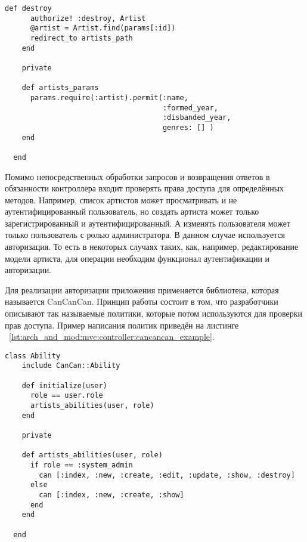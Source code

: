 \begin{lstlisting}[style=fsharpstyle,caption={Пример получения артистов по определённым параметрам}, label=lst:arch_and_mod:mvc:controller:artists_controller_example]
    def destroy
      authorize! :destroy, Artist
      @artist = Artist.find(params[:id])
      redirect_to artists_path
    end

    private

    def artists_params
      params.require(:artist).permit(:name,
                                     :formed_year,
                                     :disbanded_year,
                                     genres: [] )
    end

  end
\end{lstlisting}

Помимо непосредственных обработки запросов и возвращения ответов в обязанности контроллера входит проверять права доступа для определённых методов. Например, список артистов может просматривать и не аутентифицированный пользователь, но создать артиста может только зарегистрированный и аутентифицированный. А изменять пользователя может только пользователь с ролью администратора. В данном случае используется авторизация. То есть в некоторых случаях таких, как, например, редактирование модели артиста, для операции необходим функционал аутентификации и авторизации.

Для реализации авторизации приложения применяется библиотека, которая называется CanCanCan. Принцип работы состоит в том, что разработчики описывают так называемые политики, которые потом используются для проверки прав доступа. Пример написания политик приведён на листинге ~\ref{lst:arch_and_mod:mvc:controller:cancancan_example}.

\begin{lstlisting}[style=fsharpstyle,caption={Пример получения артистов по определённым параметрам}, label=lst:arch_and_mod:mvc:controller:cancancan_example]
  class Ability
    include CanCan::Ability

    def initialize(user)
      role == user.role
      artists_abilities(user, role)
    end

    private

    def artists_abilities(user, role)
      if role == :system_admin
        can [:index, :new, :create, :edit, :update, :show, :destroy]
      else
        can [:index, :new, :create, :show]
      end
    end

  end

\end{lstlisting}

